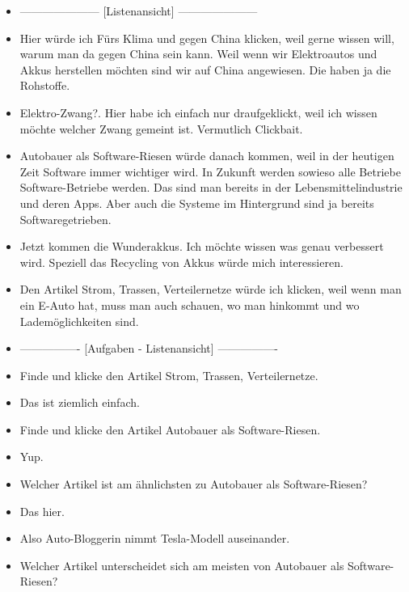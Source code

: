 {\begin{itemize}[]
        \item {---------------------} [Listenansicht] {---------------------}
        \item {} Hier würde ich \flqq Fürs Klima und gegen China\frqq{} klicken, weil gerne wissen will, warum man da gegen China sein kann.
              Weil wenn wir Elektroautos und Akkus herstellen möchten sind wir auf China angewiesen.
              Die haben ja die Rohstoffe.
        \item {} \flqq Elektro-Zwang?\frqq{}.
              Hier habe ich einfach nur draufgeklickt, weil ich wissen möchte welcher Zwang gemeint ist.
              Vermutlich Clickbait.
        \item {} \flqq Autobauer als Software-Riesen\frqq{} würde danach kommen, weil in der heutigen Zeit Software immer wichtiger wird.
              In Zukunft werden sowieso alle Betriebe Software-Betriebe werden.
              Das sind man bereits in der Lebensmittelindustrie und deren Apps.
              Aber auch die Systeme im Hintergrund sind ja bereits Softwaregetrieben.
        \item {} \flqq Jetzt kommen die Wunderakkus\frqq{}.
              Ich möchte wissen was genau verbessert wird.
              Speziell das Recycling von Akkus würde mich interessieren.
        \item {} Den Artikel \flqq Strom, Trassen, Verteilernetze\frqq{} würde ich klicken, weil wenn man ein E-Auto hat, muss man auch schauen, wo man hinkommt und wo Lademöglichkeiten sind.
        \item {----------------} [Aufgaben - Listenansicht] {----------------}
        \item {} Finde und klicke den Artikel \flqq Strom, Trassen, Verteilernetze\frqq{}.
        \item {} Das ist ziemlich einfach.
        \item {} Finde und klicke den Artikel \flqq Autobauer als Software-Riesen\frqq{}.
        \item {} Yup.
        \item {} Welcher Artikel ist am ähnlichsten zu \flqq Autobauer als Software-Riesen\frqq{}?
        \item {} Das hier.
        \item {} Also \flqq Auto-Bloggerin nimmt Tesla-Modell auseinander\frqq{}.
        \item {} Welcher Artikel unterscheidet sich am meisten von \flqq Autobauer als Software-Riesen\frqq{}?

\end{itemize}}
